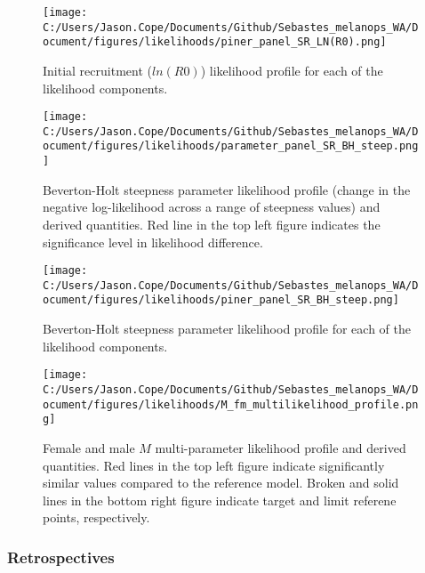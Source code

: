 \documentclass[11pt,
  english,
  letterpaper,
]{article}
\begin{document}
\pagebreak

\begin{figure}
\centering
\texttt{[image: C:/Users/Jason.Cope/Documents/Github/Sebastes\_melanops\_WA/Document/figures/likelihoods/piner\_panel\_SR\_LN(R0).png]}
\caption{Initial recruitment (\(ln(R0)\)) likelihood profile for each of the likelihood components.\label{fig:R0-profile-components}}
\end{figure}

\pagebreak

\begin{figure}
\centering
\texttt{[image: C:/Users/Jason.Cope/Documents/Github/Sebastes\_melanops\_WA/Document/figures/likelihoods/parameter\_panel\_SR\_BH\_steep.png]}
\caption{Beverton-Holt steepness parameter likelihood profile (change in the negative log-likelihood across a range of steepness values) and derived quantities. Red line in the top left figure indicates the significance level in likelihood difference.\label{fig:steepness-profile}}
\end{figure}

\pagebreak

\begin{figure}
\centering
\texttt{[image: C:/Users/Jason.Cope/Documents/Github/Sebastes\_melanops\_WA/Document/figures/likelihoods/piner\_panel\_SR\_BH\_steep.png]}
\caption{Beverton-Holt steepness parameter likelihood profile for each of the likelihood components.\label{fig:steepness-profile-components}}
\end{figure}

\pagebreak

\begin{figure}
\centering
\texttt{[image: C:/Users/Jason.Cope/Documents/Github/Sebastes\_melanops\_WA/Document/figures/likelihoods/M\_fm\_multilikelihood\_profile.png]}
\caption{Female and male \(M\) multi-parameter likelihood profile and derived quantities. Red lines in the top left figure indicate significantly similar values compared to the reference model. Broken and solid lines in the bottom right figure indicate target and limit referene points, respectively.\label{fig:M-multiprofile-combo}}
\end{figure}

\pagebreak

\hypertarget{retrospectives}{%
\subsubsection{Retrospectives}\label{retrospectives}}
\end{document}
